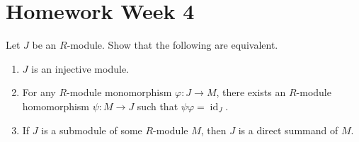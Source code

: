 \section{Homework Week 4}

\begin{exercise}
    Let $J$ be an $R$-module. Show that the following are equivalent.
    \begin{enumerate}
        \item $J$ is an injective module.
        \item For any $R$-module monomorphism $\varphi \colon J \to M$, there exists an $R$-module homomorphism $\psi \colon M \to J$ such that $\psi\varphi=\operatorname{id}_J$.
        \item If $J$ is a submodule of some $R$-module $M$, then $J$ is a direct summand of $M$.
    \end{enumerate}
\end{exercise}

